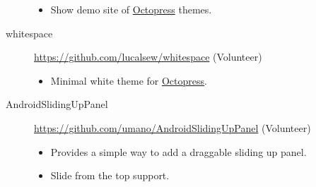 \documentclass[a4paper,10pt]{article}
\begin{document}
\begin{description}
    \begin{itemize}
      \item Show demo site of \href{http://octopress.org}{Octopress} themes.
    \end{itemize}
  \item[whitespace] \url{https://github.com/lucalsew/whitespace} (Volunteer)
    \begin{itemize}
      \item Minimal white theme for \href{http://octopress.org}{Octopress}.
    \end{itemize}
  \item[AndroidSlidingUpPanel] \url{https://github.com/umano/AndroidSlidingUpPanel} (Volunteer)
    \begin{itemize}
      \item Provides a simple way to add a draggable sliding up panel.
      \item Slide from the top support.
    \end{itemize}
\end{description}


\end{document}
